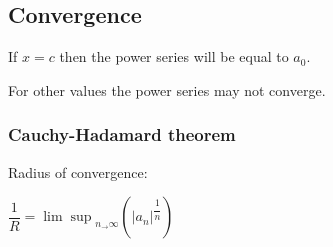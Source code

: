 
\subsection{Convergence}

If \(x=c\) then the power series will be equal to \(a_0\).

For other values the power series may not converge.

\subsubsection{Cauchy-Hadamard theorem}

Radius of convergence:

\(\dfrac{1}{R}={\lim \sup}_{n_\rightarrow \infty} (|a_n|^{\dfrac{1}{n}})\)

